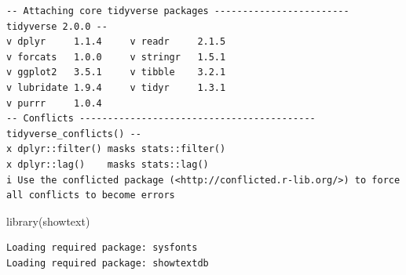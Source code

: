 \documentclass[
  letterpaper,
  DIV=11,
  numbers=noendperiod]{scrreprt}
\newenvironment{Shaded}{\begin{snugshade}}{\end{snugshade}}
\newcommand{\FunctionTok}[1]{\textcolor[rgb]{0.28,0.35,0.67}{#1}}
\newcommand{\NormalTok}[1]{\textcolor[rgb]{0.00,0.23,0.31}{#1}}
\begin{document}
\begin{verbatim}
-- Attaching core tidyverse packages ------------------------ tidyverse 2.0.0 --
v dplyr     1.1.4     v readr     2.1.5
v forcats   1.0.0     v stringr   1.5.1
v ggplot2   3.5.1     v tibble    3.2.1
v lubridate 1.9.4     v tidyr     1.3.1
v purrr     1.0.4     
-- Conflicts ------------------------------------------ tidyverse_conflicts() --
x dplyr::filter() masks stats::filter()
x dplyr::lag()    masks stats::lag()
i Use the conflicted package (<http://conflicted.r-lib.org/>) to force all conflicts to become errors
\end{verbatim}

\begin{Shaded}
\begin{Highlighting}[]
\FunctionTok{library}\NormalTok{(showtext)}
\end{Highlighting}
\end{Shaded}

\begin{verbatim}
Loading required package: sysfonts
Loading required package: showtextdb
\end{verbatim}
\end{document}
